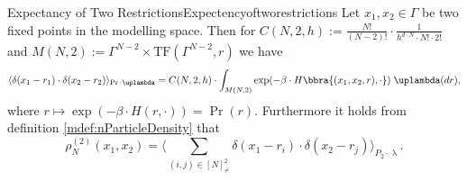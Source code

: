 \begin{mlem}{Expectancy of Two Restrictions}{Expectencyoftworestrictions}
    Let $x_1,x_2\in\Gamma$ be two fixed points in the modelling space. Then for $C(N,2,h):=\frac{N!}{(N-2)!}\cdot\frac{1}{h^{d\cdot N}\cdot N!\cdot 2!}$ and $M(N,2):=\Gamma^{N-2}\times\text{TF}(\Gamma^{N-2},r)$ we have
    \[
        \langle
            \delta(x_1 - r_1)\cdot\delta(x_2 - r_2)
        \rangle_{\Pr\cdot\uplambda} 
        = C(N,2,h)\cdot\int_{M(N,2)}
            \exp(-\beta\cdot H\bbra{(x_1,x_2,r),\cdot})
        \;\uplambda(dr),
    \]
    where $r\mapsto \exp(-\beta\cdot H(r,\cdot)) = \Pr(r)$.
    Furthermore it holds from definition \ref{mdef:nParticleDensity} that
    \[
        \rho_N^{(2)}(x_1,x_2) = \Biggl\langle
            \sum_{(i,j)\in[N]^2_{\neq}}\delta(x_1 - r_i)\cdot\delta(x_2 - r_j)
        \Biggr\rangle_{P_2\cdot\uplambda}.
    \]
\end{mlem}
